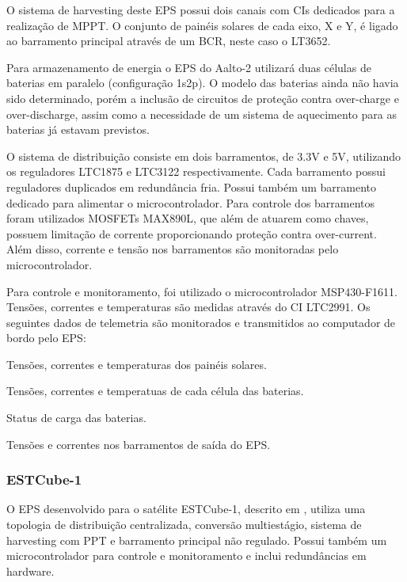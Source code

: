 O sistema de harvesting deste \gls{EPS} possui dois canais com CIs dedicados para a realização de \gls{MPPT}. O conjunto de painéis solares de cada eixo, X e Y, é ligado ao barramento principal através de um \gls{BCR}, neste caso o LT3652.

Para armazenamento de energia o EPS do Aalto-2 utilizará duas células de baterias em paralelo (configuração 1s2p). O modelo das baterias ainda não havia sido determinado, porém a inclusão de circuitos de proteção contra over-charge e over-discharge, assim como a necessidade de um sistema de aquecimento para as baterias já estavam previstos.

O sistema de distribuição consiste em dois barramentos, de 3.3V e 5V, utilizando os reguladores LTC1875 e LTC3122 respectivamente.
Cada barramento possui reguladores duplicados em redundância fria.
Possui também um barramento dedicado para alimentar o microcontrolador.
Para controle dos barramentos foram utilizados MOSFETs MAX890L, que além de atuarem como chaves, possuem limitação de corrente proporcionando proteção contra over-current.
Além disso, corrente e tensão nos barramentos são monitoradas pelo microcontrolador.

Para controle e monitoramento, foi utilizado o microcontrolador MSP430-F1611. Tensões, correntes e temperaturas são medidas através do CI LTC2991. Os seguintes dados de telemetria são monitorados e transmitidos ao computador de bordo pelo EPS:
\begin{alineas}
    \item Tensões, correntes e temperaturas dos painéis solares.
    \item Tensões, correntes e temperatuas de cada célula das baterias.
    \item Status de carga das baterias.
    \item Tensões e correntes nos barramentos de saída do EPS.
\end{alineas}


\subsubsection{ESTCube-1}

O \gls{EPS} desenvolvido para o satélite ESTCube-1, descrito em \textcite{estcube-eps}, utiliza uma topologia de distribuição centralizada, conversão multiestágio, sistema de harvesting com \gls{PPT} e barramento principal não regulado.
Possui também um microcontrolador para controle e monitoramento e inclui redundâncias em hardware.

